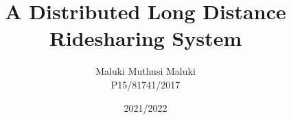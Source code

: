 \documentclass{beamer}
\title{A Distributed Long Distance Ridesharing System}
\author{
        Maluki Muthusi Maluki \\
        P15/81741/2017
}
\institute{
    University of Nairobi \\
    Department of Computing and Informatics
}
\date{2021/2022}
\begin{document}
\begin{frame}[plain]\titlepage\end{frame}













\end{document}
